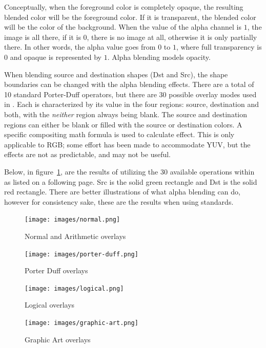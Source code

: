 Conceptually, when the foreground color is completely opaque, the resulting blended color will be the foreground color.  If it is transparent, the blended color will be the color of the background.  When the value of the alpha channel is $1$, the image is all there, if it is $0$, there is no image at all, otherwise it is only partially there.  In other words, the alpha value goes from $0$ to $1$, where full transparency is $0$ and opaque is represented by $1$.  Alpha blending models opacity. 

When blending source and destination shapes (Dst and Src), the shape boundaries can be changed with the alpha blending effects.  There are a total of 10 standard Porter-Duff operators, but there are 30 possible overlay modes used in \CGG{}.  Each is characterized by its value in the four regions: source, destination and both, with the \textit{neither} region always being blank.  The source and destination regions can either be blank or filled with the source or destination colors.  A specific compositing math formula is used to calculate effect.  This is only applicable to RGB; some effort has been made to accommodate YUV, but the effects are not as predictable, and may not be useful. 

Below, in figure~\ref{fig:normal}, are the results of utilizing the 30 available operations within \CGG{} as listed on a following page.  Src is the solid green rectangle and Dst is the solid red rectangle.  There are better illustrations of what alpha blending can do, however for consistency sake, these are the results when using standards.

\begin{figure}[htpb]
    \centering
    \texttt{[image: images/normal.png]}
    \caption{Normal and Arithmetic overlays}
    \label{fig:normal}
\end{figure}

\begin{figure}[htpb]
    \centering
    \texttt{[image: images/porter-duff.png]}
    \caption{Porter Duff overlays}
\end{figure}

\begin{figure}[htpb]
    \centering
    \texttt{[image: images/logical.png]}
    \caption{Logical overlays}
\end{figure}

\begin{figure}[htpb]
    \centering
    \texttt{[image: images/graphic-art.png]}
    \caption{Graphic Art overlays}
\end{figure}

